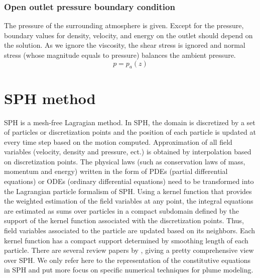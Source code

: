 \documentclass[gmd, manuscript]{copernicus} %
\begin{document}
\subsubsection{Open outlet pressure boundary condition}
The pressure of the surrounding atmosphere is given. Except for the pressure, boundary values for density, velocity, and energy on the outlet should depend on the solution. As we ignore the viscosity, the shear stress is ignored and normal stress (whose magnitude equals to pressure) balances the ambient pressure.
\begin{equation}
p = p_a\left(z\right)  \label{eq:pressure_bc_p} 
\end{equation} 

\section{SPH method} \label{sec:SPH_method}
SPH is a mesh-free Lagragian method. In SPH, the domain is discretized by a set of particles or discretization points and the position of each particle is updated at every time step based on the motion computed. Approximation of all field variables (velocity, density and pressure, ect.) is obtained by interpolation based on discretization points. The physical laws (such as conservation laws of mass, momentum and energy) written in the form of PDEs (partial differential equations)  or ODEs (ordinary differential equations) need to be transformed into the Lagrangian particle formalism of SPH. Using a kernel function that provides the weighted estimation of the field variables at any point, the integral equations are estimated as sums over particles in a compact subdomain defined by the support of the kernel function associated with the discretization points. Thus, field variables associated to the particle are updated based on its neighbors. Each kernel function has a compact support determined by smoothing length of each particle. There are several review papers by \citet{monaghan1992smoothed, monaghan2005smoothed, rosswog2009astrophysical, price2012smoothed, monaghan2012smoothed}, giving a pretty comprehensive view over SPH. We only refer here to the representation of the constitutive equations in SPH and put more focus on specific numerical techniques for plume modeling.
\end{document}
